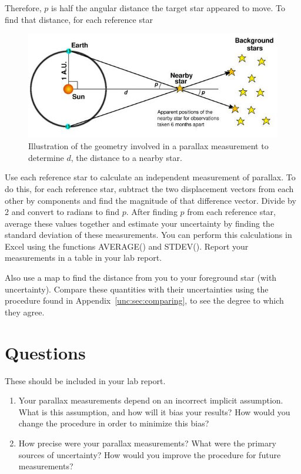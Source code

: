 Therefore, $p$ is half the angular distance the target star appeared to move. To find that distance, for each reference star

\begin{figure}
	\includegraphics[width=\textwidth]{parallax/parallax-figure}
	\caption{Illustration of the geometry involved in a parallax measurement to determine $d$, the distance to a nearby star.}\label{par:fig:figure}
\end{figure}

Use each reference star to calculate an independent measurement of parallax. To do this, for each reference star, subtract the two displacement vectors from each other by components and find the magnitude of that difference vector. Divide by 2 and convert to radians to find $p$. After finding $p$ from each reference star, average these values together and estimate your uncertainty by finding the standard
deviation of these measurements. You can perform this calculations in Excel using the
functions AVERAGE() and STDEV(). Report your measurements in a table in your lab
report.

Also use a map to find the distance from you to your foreground star (with uncertainty). Compare these quantities with their uncertainties using the procedure found in Appendix~\ref{unc:sec:comparing}, to see the degree to which they agree.

\section{Questions}\label{par:sec:questions}

These should be included in your lab report.

\begin{enumerate}
	\item Your parallax measurements depend on an incorrect implicit assumption. What is
	this assumption, and how will it bias your results? How would you change the
	procedure in order to minimize this bias?
	\item How precise were your parallax measurements? What were the primary sources
	of uncertainty? How would you improve the procedure for future measurements?
\end{enumerate}

